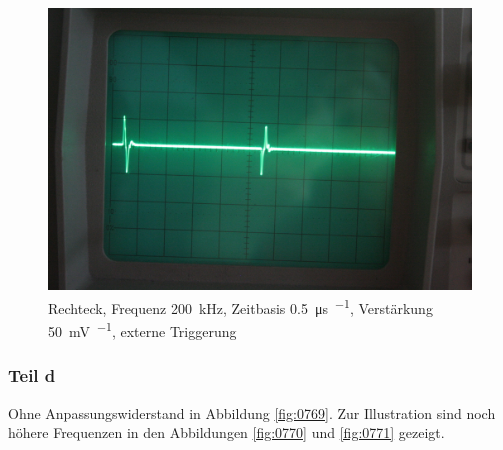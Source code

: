 \begin{figure}
	\centering
	\begin{minipage}{.45\linewidth}
	\end{minipage}
	\hfill
	\begin{minipage}{.45\linewidth}
	\includegraphics[width=\linewidth]{Fotos/IMG_0768-1500.jpg}
	\end{minipage}
	\caption{%
		Rechteck, Frequenz \SI{200}{\kilo\hertz},
		Zeitbasis \SI{.5}{\micro\second\per\division},
		Verstärkung \SI{50}{\milli\volt\per\division},
		externe Triggerung
	}
	\label{fig:0768}
\end{figure}

\FloatBarrier
\subsubsection{Teil d}

Ohne Anpassungswiderstand in Abbildung \ref{fig:0769}. Zur Illustration sind
noch höhere Frequenzen in den Abbildungen \ref{fig:0770} und \ref{fig:0771}
gezeigt.

